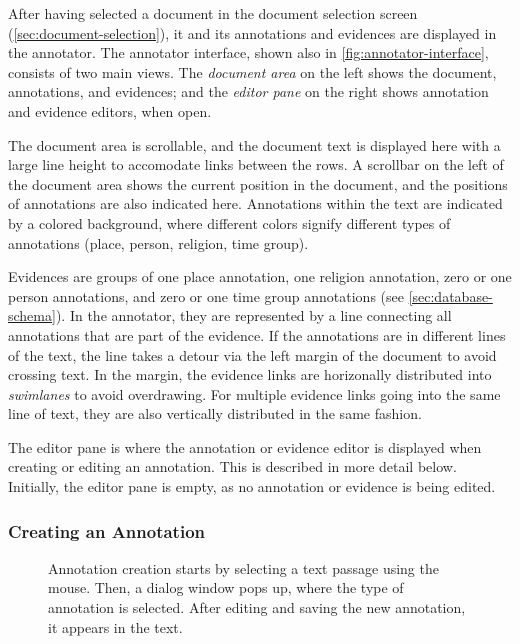 After having selected a document in the document selection screen (\cref{sec:document-selection}), it and its annotations and evidences are displayed in the annotator.
The annotator interface, shown also in \cref{fig:annotator-interface}, consists of two main views.
The \emph{document area} on the left shows the document, annotations, and evidences;
and the \emph{editor pane} on the right shows annotation and evidence editors, when open.

The document area is scrollable, and the document text is displayed here with a large line height to accomodate links between the rows.
A scrollbar on the left of the document area shows the current position in the document, and the positions of annotations are also indicated here.
Annotations within the text are indicated by a colored background, where different colors signify different types of annotations (place, person, religion, time group).

Evidences are groups of one place annotation, one religion annotation, zero or one person annotations, and zero or one time group annotations (see \cref{sec:database-schema}).
In the annotator, they are represented by a line connecting all annotations that are part of the evidence.
If the annotations are in different lines of the text, the line takes a detour via the left margin of the document to avoid crossing text.
In the margin, the evidence links are horizonally distributed into \emph{swimlanes} to avoid overdrawing.
For multiple evidence links going into the same line of text, they are also vertically distributed in the same fashion.

The editor pane is where the annotation or evidence editor is displayed when creating or editing an annotation.
This is described in more detail below.
Initially, the editor pane is empty, as no annotation or evidence is being edited.


\subsubsection{Creating an Annotation}
\label{sec:annotation-creation}

\begin{figure}[htb]

  \caption{
    Annotation creation starts by selecting a text passage using the mouse.
    Then, a dialog window pops up, where the type of annotation is selected.
    After editing and saving the new annotation, it appears in the text.
  }
  \label{fig:create-annotation}
\end{figure}

